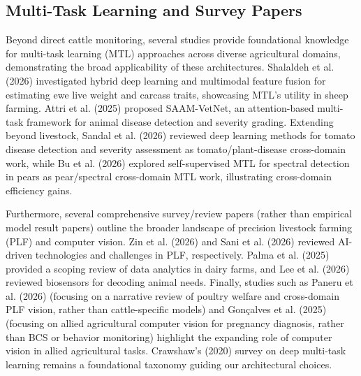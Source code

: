 \subsection{Multi-Task Learning and Survey Papers}

Beyond direct cattle monitoring, several studies provide foundational knowledge for multi-task learning (MTL) approaches across diverse agricultural domains, demonstrating the broad applicability of these architectures. Shalaldeh et al. (2026) \cite{shalaldeh2026biol} investigated hybrid deep learning and multimodal feature fusion for estimating ewe live weight and carcass traits, showcasing MTL's utility in sheep farming. Attri et al. (2025) \cite{attri2025saamvetnet} proposed SAAM-VetNet, an attention-based multi-task framework for animal disease detection and severity grading. Extending beyond livestock, Sandal et al. (2026) \cite{sandal2026v1} reviewed deep learning methods for tomato disease detection and severity assessment as tomato/plant-disease cross-domain work, while Bu et al. (2026) \cite{bu2026jsaa} explored self-supervised MTL for spectral detection in pears as pear/spectral cross-domain MTL work, illustrating cross-domain efficiency gains.

Furthermore, several comprehensive survey/review papers (rather than empirical model result papers) outline the broader landscape of precision livestock farming (PLF) and computer vision. Zin et al. (2026) \cite{zin2026ab26} and Sani et al. (2026) \cite{sani2026ab25} reviewed AI-driven technologies and challenges in PLF, respectively. Palma et al. (2025) \cite{palma2025ani1} provided a scoping review of data analytics in dairy farms, and Lee et al. (2026) \cite{lee2026ab26} reviewed biosensors for decoding animal needs. Finally, studies such as Paneru et al. (2026) \cite{paneru2026jpsj} (focusing on a narrative review of poultry welfare and cross-domain PLF vision, rather than cattle-specific models) and Gonçalves et al. (2025) \cite{gonçalves2025skaf} (focusing on allied agricultural computer vision for pregnancy diagnosis, rather than BCS or behavior monitoring) highlight the expanding role of computer vision in allied agricultural tasks. Crawshaw's (2020) \cite{crawshaw2020mtl} survey on deep multi-task learning remains a foundational taxonomy guiding our architectural choices.

